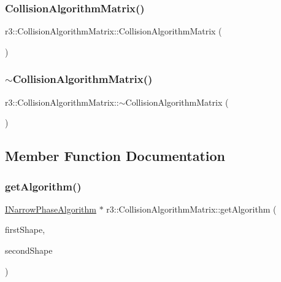 \subsubsection{\texorpdfstring{Collision\+Algorithm\+Matrix()}{CollisionAlgorithmMatrix()}}
{\footnotesize\ttfamily r3\+::\+Collision\+Algorithm\+Matrix\+::\+Collision\+Algorithm\+Matrix (\begin{DoxyParamCaption}{ }\end{DoxyParamCaption})\hspace{0.3cm}{\ttfamily [explicit]}}

\mbox{\label{classr3_1_1_collision_algorithm_matrix_adea2db794d9606ecf24745ad6ac912d8}} 
\subsubsection{\texorpdfstring{$\sim$\+Collision\+Algorithm\+Matrix()}{~CollisionAlgorithmMatrix()}}
{\footnotesize\ttfamily r3\+::\+Collision\+Algorithm\+Matrix\+::$\sim$\+Collision\+Algorithm\+Matrix (\begin{DoxyParamCaption}{ }\end{DoxyParamCaption})\hspace{0.3cm}{\ttfamily [default]}}



\subsection{Member Function Documentation}
\mbox{\label{classr3_1_1_collision_algorithm_matrix_ad40e0f125b95d6bcdb2e8a27c1397e68}} 
\subsubsection{\texorpdfstring{get\+Algorithm()}{getAlgorithm()}}
{\footnotesize\ttfamily \mbox{\hyperlink{classr3_1_1_i_narrow_phase_algorithm}{I\+Narrow\+Phase\+Algorithm}} $\ast$ r3\+::\+Collision\+Algorithm\+Matrix\+::get\+Algorithm (\begin{DoxyParamCaption}\item[{Collision\+Primitive\+Type}]{first\+Shape,  }\item[{Collision\+Primitive\+Type}]{second\+Shape }\end{DoxyParamCaption})}



